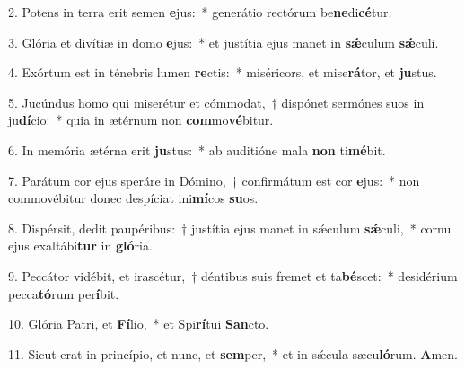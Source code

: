 \item 2. Potens in terra erit semen \textbf{e}jus:~* generátio rectórum be\textbf{ne}di\textbf{cé}tur.
\item 3. Glória et divítiæ in domo \textbf{e}jus:~* et justítia ejus manet in \textbf{sǽ}culum \textbf{sǽ}culi.
\item 4. Exórtum est in ténebris lumen \textbf{re}ctis:~* miséricors, et mise\textbf{rá}tor, et \textbf{ju}stus.
\item 5. Jucúndus homo qui miserétur et cómmodat,~† dispónet sermónes suos in ju\textbf{dí}cio:~* quia in ætérnum non \textbf{com}mo\textbf{vé}bitur.
\item 6. In memória ætérna erit \textbf{ju}stus:~* ab auditióne mala \textbf{non} ti\textbf{mé}bit.
\item 7. Parátum cor ejus speráre in Dómino,~† confirmátum est cor \textbf{e}jus:~* non commovébitur donec despíciat ini\textbf{mí}cos \textbf{su}os.
\item 8. Dispérsit, dedit paupéribus:~† justítia ejus manet in sǽculum \textbf{sǽ}culi,~* cornu ejus exaltábi\textbf{tur} in \textbf{gló}ria.
\item 9. Peccátor vidébit, et irascétur,~† déntibus suis fremet et ta\textbf{bé}scet:~* desidérium pecca\textbf{tó}rum per\textbf{í}bit.
\item 10. Glória Patri, et \textbf{Fí}lio,~* et Spi\textbf{rí}tui \textbf{San}cto.
\item 11. Sicut erat in princípio, et nunc, et \textbf{sem}per,~* et in sǽcula sæcu\textbf{ló}rum. \textbf{A}men.